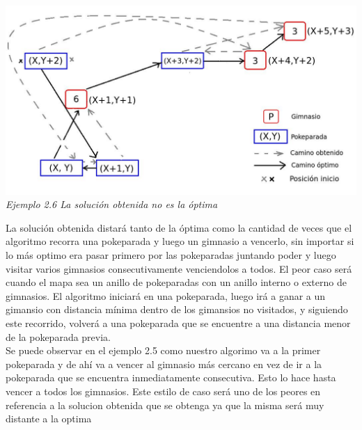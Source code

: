   
\vspace*{0.3cm} \vspace*{0.3cm}
  \begin{center}
\includegraphics[scale=0.60]{./EJ2/nooptima2.jpeg}
\\{\textit{Ejemplo 2.6 La soluci\'on obtenida no es la \'optima}}
  \end{center}
  \vspace*{0.3cm}

La soluci\'on obtenida distará tanto de la óptima como la cantidad de veces que el algoritmo recorra una pokeparada y luego un gimnasio a vencerlo, sin importar si lo más optimo era pasar primero por las pokeparadas juntando poder y luego visitar varios gimnasios consecutivamente venciendolos a todos.
El peor caso será cuando el mapa sea un anillo de pokeparadas con un anillo interno o externo de gimnasios. 
El algoritmo iniciará en una pokeparada, luego irá a ganar a un gimansio con distancia mínima dentro de los gimansios no visitados, y siguiendo este recorrido, volverá a una pokeparada que se encuentre a una distancia menor de la pokeparada previa.\\

Se puede observar en el ejemplo 2.5 como nuestro algorimo va a la primer pokeparada y de ah\'i va a vencer al gimnasio m\'as cercano en vez de ir a la pokeparada que se encuentra inmediatamente consecutiva. Esto lo hace hasta vencer a todos los gimnasios.
Este estilo de caso será uno de los peores en referencia a la solucion obtenida que se obtenga ya que la misma ser\'a muy distante a la optima
